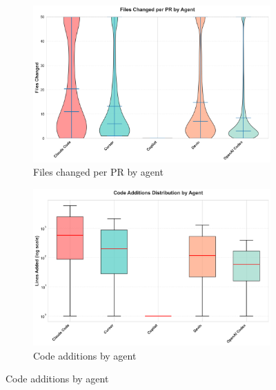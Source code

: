 \documentclass[11pt]{article}
\begin{document}
\begin{figure}[H]
\centering
\begin{subfigure}[b]{0.48\textwidth}
\centering
\includegraphics[width=\textwidth]{figures_individual/31_entity_files_changed_by_agent.png}
\caption{Files changed per PR by agent}
\label{fig:entity_files}
\end{subfigure}
\hfill
\begin{subfigure}[b]{0.48\textwidth}
\centering
\includegraphics[width=\textwidth]{figures_individual/32_entity_lines_added_by_agent.png}
\caption{Code additions by agent}
\label{fig:entity_additions}
\end{subfigure}

\vspace{0.3cm}


\end{figure}
\end{document}
